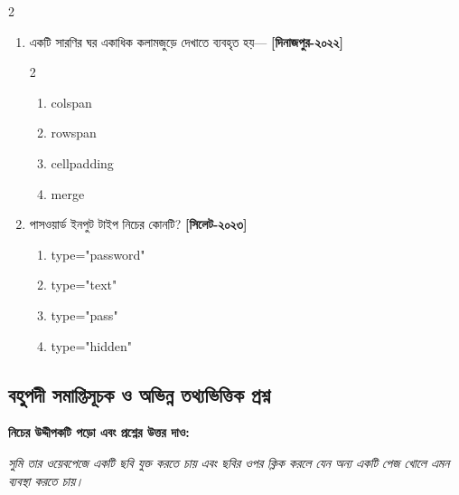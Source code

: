 \begin{multicols}{2}
\begin{enumerate}[resume=chFourFinalQuestions]
\begin{minipage}[t]{\linewidth}
\end{minipage}

\item \begin{minipage}[t]{\linewidth}
একটি সারণির ঘর একাধিক কলামজুড়ে দেখাতে ব্যবহৃত হয়— \textbf{[দিনাজপুর-২০২২]}
\begin{multicols}{2}
\begin{enumerate}[label=\alph*)]
\item colspan 
\item rowspan
\item cellpadding
\item merge
\end{enumerate}
\end{multicols}
\par\addvspace{2pt}


\end{minipage}

\item \begin{minipage}[t]{\linewidth}
পাসওয়ার্ড ইনপুট টাইপ নিচের কোনটি? \textbf{[সিলেট-২০২৩]}
\begin{enumerate}[label=\alph*)]
\item type="password" 
\item type="text"
\item type="pass"
\item type="hidden"
\end{enumerate}


\end{minipage}

\end{enumerate}

\subsection*{বহুপদী সমাপ্তিসূচক ও অভিন্ন তথ্যভিত্তিক প্রশ্ন}

\noindent\begin{minipage}[t]{\linewidth}
\textbf{নিচের উদ্দীপকটি পড়ো এবং প্রশ্নের উত্তর দাও:}

\textit{সুমি তার ওয়েবপেজে একটি ছবি যুক্ত করতে চায় এবং ছবির ওপর ক্লিক করলে যেন অন্য একটি পেজ খোলে এমন ব্যবস্থা করতে চায়।}

\end{minipage}

\begin{enumerate}[resume=chFourFinalQuestions]


\end{enumerate}
\end{multicols}
